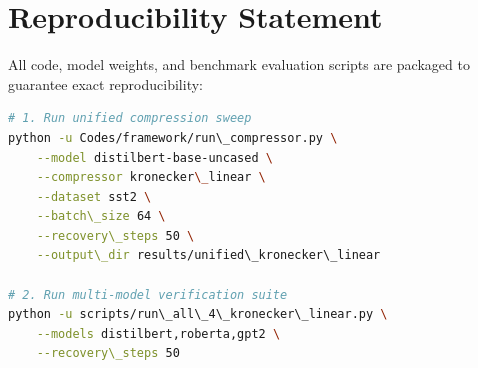 \section{Reproducibility Statement}
All code, model weights, and benchmark evaluation scripts are packaged to guarantee exact reproducibility:
\begin{lstlisting}[language=bash]
# 1. Run unified compression sweep
python -u Codes/framework/run\_compressor.py \
    --model distilbert-base-uncased \
    --compressor kronecker\_linear \
    --dataset sst2 \
    --batch\_size 64 \
    --recovery\_steps 50 \
    --output\_dir results/unified\_kronecker\_linear

# 2. Run multi-model verification suite
python -u scripts/run\_all\_4\_kronecker\_linear.py \
    --models distilbert,roberta,gpt2 \
    --recovery\_steps 50
\end{lstlisting}
